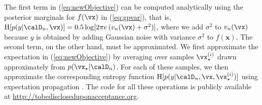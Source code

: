 The first term in (\ref{eq:newObjective}) can be computed
analytically using the posterior marginals for $f(\x)$ in (\ref{eq:gpvar}), that is,
$\H[p(y|\D_n,\x)]=0.5\log[2\pi e\,(v_n(\x)+\sigma^2)]$,
where we add $\sigma^2$ to $v_n(\x)$ because 
$y$ is obtained by adding Gaussian noise with variance $\sigma^2$ to $f(\mathbf{x})$.
The second term, on the other hand, must be approximated.
We first approximate the expectation in (\ref{eq:newObjective}) 
by averaging over samples $\xopt^{(i)}$ drawn approximately from $p(\xopt|\D_n)$.
For each of these samples, we then approximate the corresponding entropy function $\H[p(y|\D_n,\x,\xopt^{(i)})]$
using expectation propagation \cite{Minka:2001}. The code for all these operations is
publicly available at \url{http://tobediscloseduponacceptance.org}.
